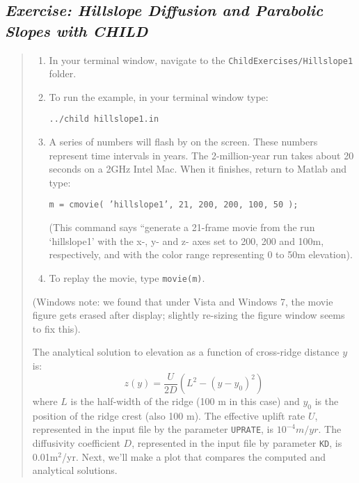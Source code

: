 \documentclass[12pt,reqno]{amsart}
\begin{document}
\subsection*{\em Exercise: Hillslope Diffusion and Parabolic Slopes with CHILD}
\begin{quote}
\small
{\sf
\begin{enumerate}
\item
In your terminal window, navigate to the {\tt ChildExercises/Hillslope1} folder. 
\item
To run the example, in your terminal window type:

\noindent
{\tt ../child hillslope1.in}

\item
A series of numbers will flash by on the screen. These numbers represent time intervals in years. The 2-million-year run takes about 20 seconds on a 2GHz Intel Mac. When it finishes, return to Matlab and type: 

{\tt m = cmovie( 'hillslope1', 21, 200, 200, 100, 50 );}

\noindent (This command says ``generate a 21-frame movie from the run `hillslope1' with the x-, y- and z- axes set to 200, 200 and 100m, respectively, and with the color range representing 0 to 50m elevation).
\item
To replay the movie, type {\tt movie(m)}.

\end{enumerate}
(Windows note: we found that under Vista and Windows 7, the movie figure gets erased after display; slightly re-sizing the figure window seems to fix this).

The analytical solution to elevation as a function of cross-ridge distance $y$ is:
\begin{equation}
z(y) = \frac{U}{2D} \left( L^2 - (y-y_0)^2 \right)
\end{equation}
where $L$ is the half-width of the ridge (100 m in this case) and $y_0$ is the position of the ridge crest (also 100 m). The effective uplift rate $U$, represented in the input file by the parameter {\tt UPRATE}, is $10^{-4}m/yr$. The diffusivity coefficient $D$, represented in the input file by parameter {\tt KD}, is 0.01m$^2$/yr. Next, we'll make a plot that compares the computed and analytical solutions. 

}
\end{quote}
\end{document}
